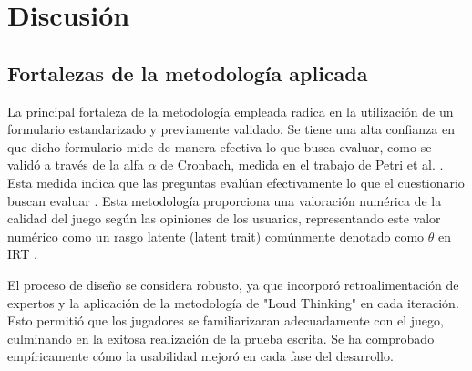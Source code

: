 \chapter{Discusión}



\section{Fortalezas de la metodología aplicada}

La principal fortaleza de la metodología empleada radica en la utilización de un formulario estandarizado y previamente validado. Se tiene una alta confianza en que dicho formulario mide de manera efectiva lo que busca evaluar, como se validó a través de la alfa $\alpha$ de Cronbach, medida en el trabajo de Petri et al. \cite{MeegaPlusManual}. Esta medida indica que las preguntas evalúan efectivamente lo que el cuestionario buscan evaluar \cite{MeegaPlusManual}. Esta metodología proporciona una valoración numérica de la calidad del juego según las opiniones de los usuarios, representando este valor numérico como un rasgo latente (latent trait) comúnmente denotado como $\theta$ en IRT \cite{maldonado2021statistical, RashMeasurementTheoryAndrichMarais}.

El proceso de diseño se considera robusto, ya que incorporó retroalimentación de expertos y la aplicación de la metodología de "Loud Thinking" en cada iteración. Esto permitió que los jugadores se familiarizaran adecuadamente con el juego, culminando en la exitosa realización de la prueba escrita. Se ha comprobado empíricamente cómo la usabilidad mejoró en cada fase del desarrollo.

